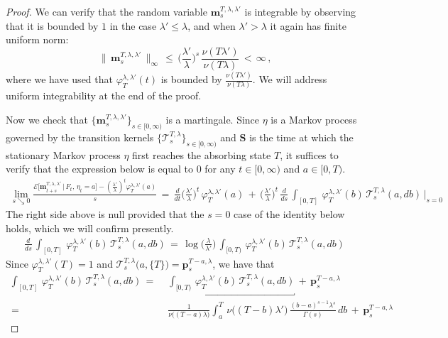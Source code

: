 \documentclass[10pt]{article}
\numberwithin{equation}{section}
\theoremstyle{definition}
\begin{document}
\begin{proof} We can verify that the random variable  $ \mathbf{m}_s^{T,\lambda,\lambda'}$ is integrable by observing that it is bounded by $1$ in the case $\lambda'\leq \lambda$, and  when $\lambda'>\lambda$  it again has finite uniform norm:
$$  \,\big\|\, \mathbf{m}_s^{T,\lambda,\lambda'}\,\big\|_{\infty}\,\leq\, \bigg( \frac{\lambda'}{\lambda}\bigg)^{s}\, \frac{\nu(T\lambda')  }{ \nu(T\lambda) }\,<\,\infty \,, $$
where we have  used that $\varphi_T^{\lambda,\lambda'}(t)$ is bounded by $\frac{\nu(T\lambda')  }{ \nu(T\lambda) }$. We will address uniform integrability at the end of the proof.

Now we check that $\{ \mathbf{m}_s^{T,\lambda,\lambda'}\}_{s\in [0,\infty)  }$ is a martingale. Since  $\eta$ is a Markov process governed by the  transition  kernels $\{ \mathscr{T}^{T,\lambda}_s\}_{s\in [0,\infty)} $ and $\mathbf{S}$ is the time at which the stationary Markov process $\eta$ first reaches the absorbing state $T$, it suffices to verify that the expression below is equal to $0$ for any $t\in [0,\infty)$ and $a\in [0,T)$.
\begin{align*}
\lim_{s\searrow 0}  \frac{\mathcal{E}\big[ \mathbf{m}_{t+s}^{T,\lambda,\lambda'}  \,\big|\,F_t,\,\eta_t=a \big]- (\frac{\lambda'}{\lambda})^{t} \varphi_T^{\lambda,\lambda'}(a) }{ s}   \,=\, \frac{d}{dt} \Big(\frac{\lambda'}{\lambda}\Big)^{t}  \, \varphi_T^{\lambda,\lambda'}( a)\,+\, \Big(\frac{\lambda'}{\lambda}\Big)^{t}\,\frac{d}{ds} \,\int_{[0,T]} \, \varphi_T^{\lambda,\lambda'}( b)\,\mathscr{T}^{T,\lambda}_{s}(a,db)\,\bigg|_{s=0}
\end{align*}
The right side above is null provided that the $s=0$ case of the identity below holds, which we will confirm presently.
\begin{align}\label{CheckThis}
 \frac{d}{ds} \,\int_{[0,T]} \, \varphi_T^{\lambda,\lambda'}(b)\,\mathscr{T}^{T,\lambda}_{s}(a,db) \,=\, \log\Big(\frac{\lambda}{\lambda'}\Big)\, \int_{[0,T)} \,\varphi_T^{\lambda,\lambda'}(b)\,\mathscr{T}^{T,\lambda}_{s}(a,db) 
\end{align}
 Since   $\varphi_T^{\lambda,\lambda'}(T)=1$ and $\mathscr{T}^{T,\lambda}_{s}\big(a, \{T\}\big)=\mathbf{p}^{T-a,\lambda}_{s} $, we have that
\begin{align}\label{ClosedThing}
    \int_{[0,T]}  \,\varphi_T^{\lambda,\lambda'}(b)\,\mathscr{T}^{T,\lambda}_{s}(a, db) \,=\, &\,\underbracket{\int_{[0,T)} \, \varphi_T^{\lambda,\lambda'}(b)\,\mathscr{T}^{T,\lambda}_{s}(a,db)}\,+\, \mathbf{p}^{T-a,\lambda}_{s} \nonumber 
    \\ \,=\,&\,\frac{ 1  }{  \nu\big((T-a)\lambda \big)    }  \int_a^T  \, \nu\big((T-b)\lambda' \big) \,\frac{(b-a)^{s-1}\lambda^s }{ \Gamma(s) } \,  db\,+\, \mathbf{p}^{T-a,\lambda}_{s} \nonumber 

\end{align}
\end{proof}
\end{document}
